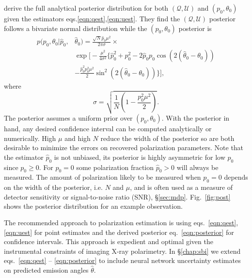 \citet{kislat_analyzing_2015} derive the full analytical posterior distribution for both $(\mathcal{Q},\mathcal{U})$ and $(p_0,\theta_0)$ given the estimators eqs.\ref{eqn:qest},\ref{eqn:uest}. They find the $(\mathcal{Q},\mathcal{U})$ posterior follows a bivariate normal distribution while the $(p_0,\theta_0)$ posterior is
\begin{equation}
\begin{aligned}
    p(p_0,\theta_0 | \hat{p}_0,& \hat{\theta}_0) ={} \frac{\sqrt{N}\hat{p}_0 \mu^2}{2\pi\sigma} \times \\
    &\exp\Bigg[-\frac{\mu^2}{4\sigma^2}\Bigg\{ \hat{p}_0^2 + p_0^2 - 2\hat{p}_0 p_0\cos(2(\hat{\theta}_0 - \theta_0)) \\ & - \frac{\hat{p}_0^2p_0^2\mu^2}{2}\sin^2(2(\hat{\theta}_0 - \theta_0)) \Bigg\} \Bigg],
\end{aligned}
\label{eqn:posterior}
\end{equation}
where 
\begin{equation}
    \sigma = \sqrt{\frac{1}{N} \left( 1 - \frac{p_0^2\mu^2}{2}\right)}.
    \label{eqn:sig}
\end{equation}
The posterior assumes a uniform prior over $(p_0,\theta_0)$. With the posterior in hand, any desired confidence interval can be computed analytically or numerically. 
High $\mu$ and high $N$ reduce the width of the posterior so are both desirable to minimize the errors on recovered polarization parameters.
Note that the estimator $\hat{p}_0$ is not unbiased, its posterior is highly asymmetric for low $p_0$ since $p_0 \geq 0$. For $p_0 = 0$ some polarization fraction $\hat{p}_0 > 0$ will always be measured. The amount of polarization likely to be measured when $p_0 = 0$ depends on the width of the posterior, i.e. $N$ and $\mu$, and is often used as a measure of detector sensitivity or signal-to-noise ratio (SNR), \S\ref{sec:mdp}.
Fig.~\ref{fig:post} shows the posterior distribution for an example observation.


The recommended approach to polarization estimation is using eqs.~\ref{eqn:qest}, \ref{eqn:uest} for point estimates and the derived posterior eq.~\ref{eqn:posterior} for confidence intervals. This approach is expedient and optimal given the instrumental constraints of imaging X-ray polarimetry. In \S\ref{chap:sbi} we extend eqs.~\ref{eqn:qest} -- \ref{eqn:posterior} to include neural network uncertainty estimates on predicted emission angles $\hat{\theta}$.






